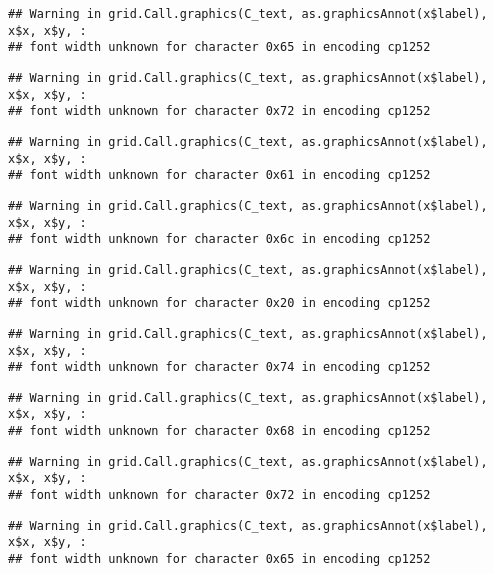 \documentclass[
]{article}
\begin{document}
\begin{verbatim}
## Warning in grid.Call.graphics(C_text, as.graphicsAnnot(x$label), x$x, x$y, :
## font width unknown for character 0x65 in encoding cp1252
\end{verbatim}

\begin{verbatim}
## Warning in grid.Call.graphics(C_text, as.graphicsAnnot(x$label), x$x, x$y, :
## font width unknown for character 0x72 in encoding cp1252
\end{verbatim}

\begin{verbatim}
## Warning in grid.Call.graphics(C_text, as.graphicsAnnot(x$label), x$x, x$y, :
## font width unknown for character 0x61 in encoding cp1252
\end{verbatim}

\begin{verbatim}
## Warning in grid.Call.graphics(C_text, as.graphicsAnnot(x$label), x$x, x$y, :
## font width unknown for character 0x6c in encoding cp1252
\end{verbatim}

\begin{verbatim}
## Warning in grid.Call.graphics(C_text, as.graphicsAnnot(x$label), x$x, x$y, :
## font width unknown for character 0x20 in encoding cp1252
\end{verbatim}

\begin{verbatim}
## Warning in grid.Call.graphics(C_text, as.graphicsAnnot(x$label), x$x, x$y, :
## font width unknown for character 0x74 in encoding cp1252
\end{verbatim}

\begin{verbatim}
## Warning in grid.Call.graphics(C_text, as.graphicsAnnot(x$label), x$x, x$y, :
## font width unknown for character 0x68 in encoding cp1252
\end{verbatim}

\begin{verbatim}
## Warning in grid.Call.graphics(C_text, as.graphicsAnnot(x$label), x$x, x$y, :
## font width unknown for character 0x72 in encoding cp1252
\end{verbatim}

\begin{verbatim}
## Warning in grid.Call.graphics(C_text, as.graphicsAnnot(x$label), x$x, x$y, :
## font width unknown for character 0x65 in encoding cp1252
\end{verbatim}
\end{document}

